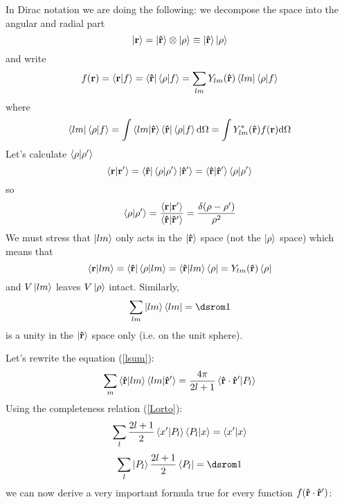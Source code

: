 In Dirac notation we are doing the following: we decompose the space into the angular and radial part 
\begin{equation*}
  \mathinner{|{{\bf r}}\rangle}=\mathinner{|{{\bf\hat r}}\rangle}\otimes\mathinner{|{\rho}\rangle} \equiv\mathinner{|{{\bf\hat r}}\rangle}\mathinner{|{\rho}\rangle}
\end{equation*}
and write 
\begin{equation*}
  f({\bf r})=\mathinner{\langle{{\bf r}|f}\rangle}=\mathinner{\langle{{\bf\hat r}}|}\mathinner{\langle{\rho|f}\rangle}= \sum_{lm}Y_{lm}({\bf\hat r})\mathinner{\langle{lm}|}\mathinner{\langle{\rho|f}\rangle}
\end{equation*}
where 
\begin{equation*}
  \mathinner{\langle{lm}|}\mathinner{\langle{\rho|f}\rangle}= \int\mathinner{\langle{lm|{\bf\hat r}}\rangle}\mathinner{\langle{{\bf\hat r}}|}\mathinner{\langle{\rho|f}\rangle}{\rm d}\Omega =\int Y_{lm}^*({\bf\hat r}) f({\bf r}){\rm d}\Omega
\end{equation*}
Let's calculate $\mathinner{\langle{\rho|\rho'}\rangle}$
\begin{equation*}
  \mathinner{\langle{{\bf r}|{\bf r'}}\rangle}=\mathinner{\langle{\bf\hat r}|}\mathinner{\langle{\rho|\rho'}\rangle}\mathinner{|{{\bf\hat r'}}\rangle} =\mathinner{\langle{{\bf\hat r}|{\bf\hat r'}}\rangle}\mathinner{\langle{\rho|\rho'}\rangle}
\end{equation*}
so 
\begin{equation*}
  \mathinner{\langle{\rho|\rho'}\rangle} ={\mathinner{\langle{{\bf r}|{\bf r'}}\rangle}\over\mathinner{\langle{{\bf\hat r}|{\bf\hat r'}}\rangle}} ={\delta(\rho-\rho')\over\rho^2}
\end{equation*}
We must stress that $\mathinner{|{lm}\rangle}$ only acts in the $\mathinner{|{{\bf\hat r}}\rangle}$ space (not the $\mathinner{|{\rho}\rangle}$ space) which means that 
\begin{equation*}
  \mathinner{\langle{{\bf r}|lm}\rangle} =\mathinner{\langle{\bf\hat r}|}\mathinner{\langle{\rho|lm}\rangle} =\mathinner{\langle{{\bf\hat r}|lm}\rangle}\mathinner{\langle{\rho}|} =Y_{lm}({\bf\hat r})\mathinner{\langle{\rho}|}
\end{equation*}
and $V\mathinner{|{lm}\rangle}$ leaves $V\mathinner{|{\rho}\rangle}$ intact. Similarly, 
\begin{equation*}
  \sum_{lm} \ket{lm}\bra{lm}=\one
\end{equation*}
is a unity in the $\mathinner{|{\bf\hat r}\rangle}$ space only (i.e. on the unit sphere).

Let's rewrite the equation (\ref{lsum}): 
\begin{equation*}
  \sum_m\mathinner{\langle{{\bf\hat r}|lm}\rangle}\mathinner{\langle{lm|{\bf\hat r'}}\rangle}= {4\pi\over 2l+1} \mathinner{\langle{{\bf\hat r}\cdot{\bf\hat r'}|P_l}\rangle}
\end{equation*}
Using the completeness relation (\ref{Lorto}): 
\begin{equation*}
  \sum_l {2l+1\over2}\mathinner{\langle{x'|P_l}\rangle}\mathinner{\langle{P_l|x}\rangle}=\mathinner{\langle{x'|x}\rangle}
\end{equation*}
\begin{equation*}
  \sum_l \ket{P_l}{2l+1\over2}\bra{P_l}=\one
\end{equation*}
we can now derive a very important formula true for every function $f({\bf\hat r}\cdot{\bf\hat r'})$:


